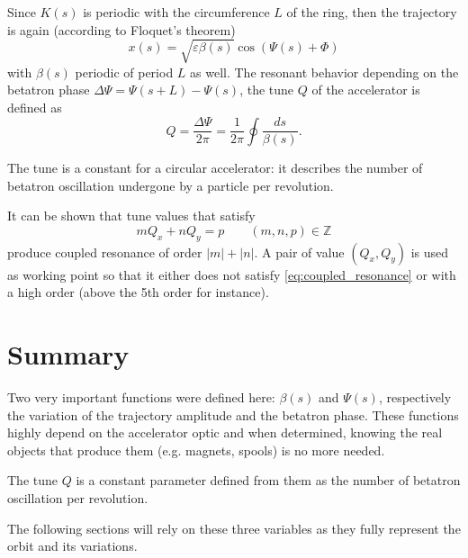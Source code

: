 Since $K(s)$ is periodic with the circumference $L$ of the ring, then the trajectory is again (according to Floquet's theorem)
\begin{equation}
x(s) = \sqrt{\varepsilon \beta(s)} \cos\left(\Psi(s)+\Phi\right)
\end{equation}
with $\beta(s)$ periodic of period $L$ as well. The resonant behavior depending on the betatron phase $\Delta \Psi = \Psi(s+L)-\Psi(s)$, the tune $Q$ of the accelerator is defined as
\begin{equation}
\label{eq:tune}
Q = \frac{\Delta \Psi}{2 \pi} = \frac{1}{2 \pi} \oint\frac{ds}{\beta(s)}.
\end{equation}

The tune is a constant for a circular accelerator: it describes the number of betatron oscillation undergone by a particle per revolution.

It can be shown that tune values that satisfy 
\begin{equation}
\label{eq:coupled_resonance}
m Q_x + n Q_y = p \qquad (m, n, p) \in \mathbb{Z}
\end{equation}
produce coupled resonance of order $|m|+|n|$. A pair of value $(Q_x,Q_y)$ is used as working point so that it either does not satisfy \cref{eq:coupled_resonance} or with a high order (above the 5th order for instance).

\section{Summary}
Two very important functions were defined here: $\beta (s)$ and $\Psi (s)$, respectively the variation of the trajectory amplitude and the betatron phase. These functions highly depend on the accelerator optic and when determined, knowing the real objects that produce them (e.g. magnets, spools) is no more needed.

The tune $Q$ is a constant parameter defined from them as the number of betatron oscillation per revolution.

The following sections will rely on these three variables as they fully represent the orbit and its variations.